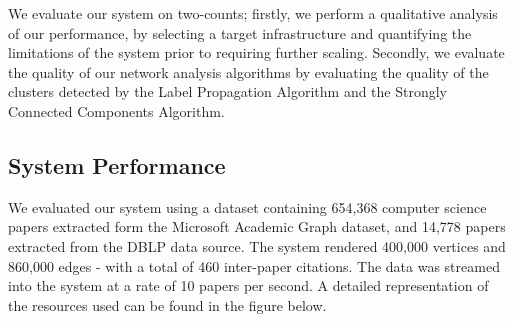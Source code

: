 \documentclass[10pt,journal,final,a4paper]{IEEEtran}
\begin{document}
We evaluate our system on two-counts; firstly, we perform a qualitative analysis of our performance, by selecting a target infrastructure and quantifying the limitations of the system prior to requiring further scaling. Secondly, we evaluate the quality of our network analysis algorithms by evaluating the quality of the clusters detected by the Label Propagation Algorithm and the Strongly Connected Components Algorithm.

\subsection{System Performance}
We evaluated our system using a dataset containing 654,368 computer science papers extracted form the Microsoft Academic Graph dataset, and 14,778 papers extracted from the DBLP data source. The system rendered 400,000 vertices and 860,000 edges - with a total of 460 inter-paper citations. The data was streamed into the system at a rate of 10 papers per second. A detailed representation of the resources used can be found in the figure below.
\end{document}
